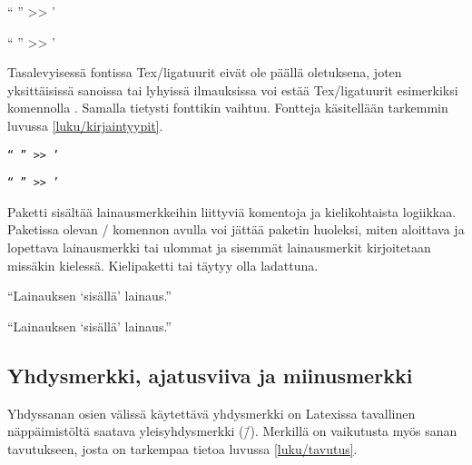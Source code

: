 \begin{koodilohkosis}
{ `` '' >> '}
\end{koodilohkosis}

\begin{tulossis}
  { `` '' >> '}
\end{tulossis}

\noindent
Tasalevyisessä fontissa Tex\-/ligatuurit eivät ole päällä oletuksena,
joten yksittäisissä sanoissa tai lyhyissä ilmauksissa voi estää
Tex\-/ligatuurit esimerkiksi komennolla . Samalla
tietysti fonttikin vaihtuu. Fontteja käsitellään tarkemmin luvussa
\ref{luku/kirjaintyypit}.

\begin{koodilohkosis}
\texttt{`` '' >> '}
\end{koodilohkosis}

\begin{tulossis}
  \texttt{`` '' >> '}
\end{tulossis}

\noindent
Paketti  sisältää lainausmerkkeihin liittyviä
komentoja ja kielikohtaista logiikkaa. Paketissa olevan
\-/ komennon avulla voi jättää paketin huoleksi, miten
aloittava ja lopettava lainausmerkki tai ulommat ja sisemmät
lainausmerkit kirjoitetaan missäkin kielessä. Kielipaketti
 tai  täytyy olla ladattuna.

\begin{koodilohkosis}
\usepackage{polyglossia} \setdefaultlanguage{finnish}
\usepackage[autostyle=true]{csquotes}
\enquote{Lainauksen \enquote{sisällä} lainaus.}
\end{koodilohkosis}

\begin{tulossis}
  \enquote{Lainauksen \enquote{sisällä} lainaus.}
\end{tulossis}

\subsection{Yhdysmerkki, ajatusviiva ja miinusmerkki}
\label{luku/yhdys-ajatus-miinus}

Yhdyssanan osien välissä käytettävä yhdysmerkki on Latexissa tavallinen
näppäimistöltä saatava yleisyhdysmerkki (\=/). Merkillä on vaikutusta
myös sanan tavutukseen, josta on tarkempaa tietoa luvussa
\ref{luku/tavutus}.

